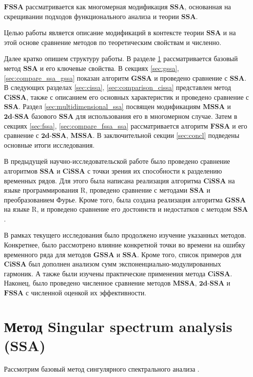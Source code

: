 \documentclass[a4paper, 11pt]{article}
\newcommand{\SSA}{\textbf{SSA}}
\newcommand{\GSSA}{\textbf{GSSA}}
\newcommand{\CISSA}{\textbf{CiSSA}}
\newcommand{\MSSA}{\textbf{MSSA}}
\newcommand{\FSSA}{\textbf{FSSA}}
\newcommand{\DSSA}{\textbf{2d-SSA}}
\begin{document}
$\FSSA$ рассматривается как многомерная модификация $\SSA$, основанная на скрещивании подходов функционального анализа и теории $\SSA$.

Целью работы является описание модификаций в контексте теории $\SSA$ и на этой основе сравнение методов по теоретическим свойствам и численно.

Далее кратко опишем структуру работы. В разделе \ref{sec:ssa} рассматривается базовый метод $\SSA$ и его ключевые свойства. В секциях \ref{sec:gssa}, \ref{sec:compare_ssa_gssa} показан алгоритм $\GSSA$ и проведено сравнение с $\SSA$. В следующих разделах \ref{sec:cissa}, \ref{sec:comparison_cissa} представлен метод $\CISSA$, также с описанием его основных характеристик и проведено сравнение с $\SSA$. Раздел \ref{sec:multidimensional_ssa} посвящен модификациям $\MSSA$ и $\DSSA$ базового $\SSA$ для использования его в многомерном случае. Затем в секциях \ref{sec:fssa}, \ref{sec:compare_fssa_ssa} рассматривается алгоритм $\FSSA$ и его сравнение с $\DSSA$, $\MSSA$.  В заключительной секции \ref{sec:concl} подведены основные итоги исследования.

В предыдущей научно-исследовательской работе было проведено сравнение алгоритмов $\SSA$ и $\CISSA$ с точки зрения их способности к разделению временных рядов. Для этого была написана реализация алгоритма $\CISSA$ на языке программирования R, проведено сравнение с методами $\SSA$ и преобразованием Фурье. Кроме того, была создана реализация алгоритма $\GSSA$ на языке R, и проведено сравнение его достоинств и недостатков с методом $\SSA$.

В рамках текущего исследования было продолжено изучение указанных методов. Конкретнее, было рассмотрено влияние конкретной точки во времени на ошибку временного ряда для методов $\GSSA$ и $\SSA$. Кроме того, список примеров для $\CISSA$ был дополнен анализом сумм экспоненциально-модулированных гармоник. А также были изучены практические применения метода $\CISSA$. Наконец, было проведено численное сравнение методов $\MSSA$, $\DSSA$ и $\FSSA$ с численной оценкой их эффективности.


\newpage

\section{Метод Singular spectrum analysis (SSA)}
\label{sec:ssa}


Рассмотрим базовый метод сингулярного спектрального анализа \cite{golyandina2001analysis}.
\end{document}
